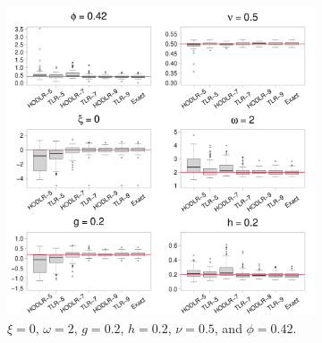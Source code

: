 \documentclass[conference]{IEEEtran}
\begin{document}
\begin{figure}[htp!]
\centering
\begin{subfigure}{0.44\textwidth}%
  \centering
  \includegraphics[width=\linewidth]{./figures/boxplot_0.420000_0.200000_0.200000.pdf}
  \caption{ $\xi = 0$, $\omega = 2$, $g = 0.2$, $h = 0.2$, $\nu = 0.5$, and $\phi = 0.42$.}
\end{subfigure}%
\hspace{4mm}
\begin{subfigure}{0.44\textwidth}%
  \centering

\end{subfigure}
\end{figure}
\end{document}

